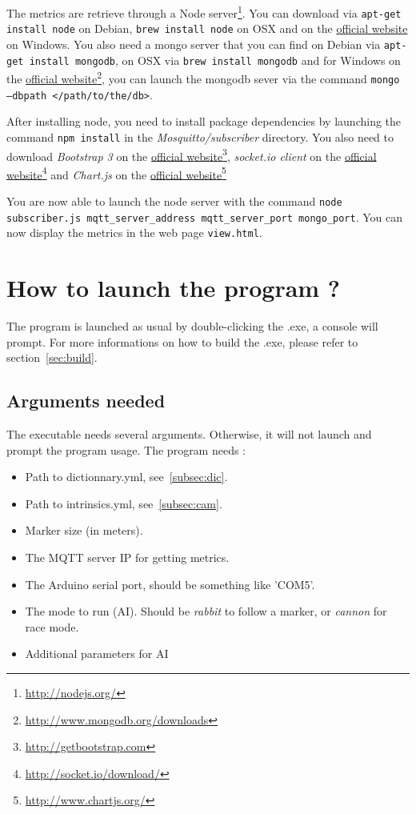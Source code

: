 \documentclass[a4paper,11pt]{report}
\begin{document}
The metrics are retrieve through a Node
server\footnote{\url{http://nodejs.org/}}. You can download via \texttt{apt-get
install node} on Debian, \texttt{brew install node} on OSX and on the
\href{http://nodejs.org}{official website} on Windows. You also need a mongo
server that you can find on Debian via \texttt{apt-get install mongodb}, on OSX
via \texttt{brew install mongodb} and for Windows on the
\href{http://www.mongodb.org/downloads}{official
website}\footnote{\url{http://www.mongodb.org/downloads}}, you can launch the
mongodb sever via the command \texttt{mongo --dbpath </path/to/the/db>}.

After installing node, you need to install package dependencies by launching
the command \texttt{npm install} in the \emph{Mosquitto/subscriber} directory.
You also need to download \emph{Bootstrap 3} on the
\href{http://getbootstrap.com/}{official
website}\footnote{\url{http://getbootstrap.com}}, \emph{socket.io client} on
the \href{http://socket.io/download/}{official
website}\footnote{\url{http://socket.io/download/}} and \emph{Chart.js} on the
\href{http://www.chartjs.org/}{official
website}\footnote{\url{http://www.chartjs.org/}}

You are now able to launch the node server with the command \texttt{node
subscriber.js mqtt\_server\_address mqtt\_server\_port mongo\_port}. You can
now display the metrics in the web page \texttt{view.html}.

\section{How to launch the program ?}

The program is launched as usual by double-clicking the .exe, a console will
prompt.  For more informations on how to build the .exe, please refer to
section~\ref{sec:build}.

\subsection{Arguments needed}
\label{sec:args}

The executable needs several arguments. Otherwise, it will not launch and
prompt the program usage.
The program needs :

\begin{itemize}
    \item Path to dictionnary.yml, see~\ref{subsec:dic}.
    \item Path to intrinsics.yml, see~\ref{subsec:cam}.
    \item Marker size (in meters).
    \item The MQTT server IP for getting metrics.
    \item The Arduino serial port, should be something like 'COM5'.
    \item The mode to run (AI). Should be \emph{rabbit} to follow a marker, or
        \emph{cannon} for race mode.
    \item Additional parameters for AI
\end{itemize}
\end{document}
